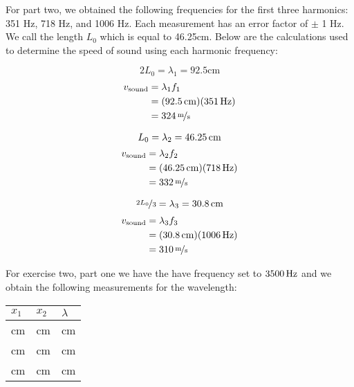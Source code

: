 \documentclass[12pt]{article}
\begin{document}
For part two, we obtained the following frequencies for the first
three harmonics: 351 Hz, 718 Hz, and 1006 Hz. Each measurement has an
error factor of $\pm$ 1 Hz. We call the length $L_0$ which is equal to
46.25cm. Below are the calculations used to determine the speed of
sound using each harmonic frequency:

\begin{equation*}
  2L_0 = \lambda_1 = 92.5 \mathrm{cm} 
\end{equation*}
\begin{equation*}
  \begin{split}
    v_{\mathrm{sound}} &= \lambda_1 f_1 \\
    &= (\unit[92.5]{cm})(\unit[351]{Hz}) \\
    &= \unitfrac[324]{m}{s}
  \end{split}
\end{equation*}

\begin{equation*}
  L_0 = \lambda_2 = \unit[46.25]{cm}
\end{equation*}
\begin{equation*}
  \begin{split}
    v_{\mathrm{sound}} &= \lambda_2 f_2 \\
    &= (\unit[46.25]{cm})(\unit[718]{Hz}) \\
    &= \unitfrac[332]{m}{s}
  \end{split}
\end{equation*}

\begin{equation*}
  \nicefrac{2L_0}{3} = \lambda_3 = \unit[30.8]{cm}
\end{equation*}
\begin{equation*}
  \begin{split}
    v_{\mathrm{sound}} &= \lambda_3 f_3 \\
    &= (\unit[30.8]{cm})(\unit[1006]{Hz}) \\
    &= \unitfrac[310]{m}{s}
  \end{split}
\end{equation*}

For exercise two, part one we have the have frequency set to
$\unit[3500]{Hz}$ and we obtain the following measurements for the
wavelength:

\begin{center}
  \begin{tabular}{|l|l|l|}
    \hline
    $x_1$ & $x_2$ & $\lambda$ \\
    \hline
    \unit[55]{cm} & \unit[45]{cm} & \unit[10]{cm} \\
    \unit[45]{cm} & \unit[35]{cm} & \unit[10]{cm} \\
    \unit[35]{cm} & \unit[25]{cm} & \unit[10]{cm} \\
    \hline
  \end{tabular}
\end{center}
\end{document}
